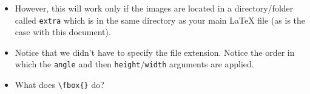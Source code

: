 \begin{itemize}
  \begin{center}
  \end{center}

\item However, this will work only if the images are located in a
  directory/folder called \verb=extra= which is in the same directory as your
  main \LaTeX{} file (as is the case with this document).

\item Notice that we didn't have to specify the file extension. Notice
  the order in which the \texttt{angle} and then
  \texttt{height}/\texttt{width} arguments are applied.

\item What does \verb!\fbox{}! do?


\end{itemize}

